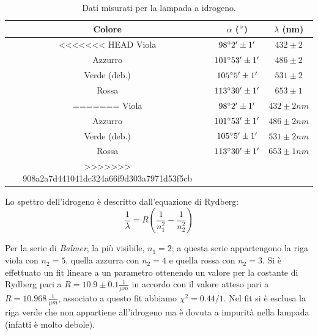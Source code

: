 \documentclass[10pt,a4paper]{article}
\begin{document}
\begin{table}[!htb]
\begin{table}[!htb]
\centering
\begin{tabular}{|c|c|c|}
\hline
Colore & $\alpha$ ($\degree$) & $\lambda$ (nm)\\
\hline 
<<<<<<< HEAD
Viola & $98 \degree 2' \pm 1'$ & $432 \pm 2$ \\ 
\hline 
Azzurro & $101 \degree 53' \pm 1'$ & $486 \pm 2 $ \\ 
\hline 
Verde (deb.)& $105 \degree 5' \pm 1'$ & $531 \pm 2 $ \\ 
\hline 
Rossa & $113 \degree 30' \pm 1'$ & $653 \pm 1 $ \\ 
=======
Viola & $98 \degree 2' \pm 1'$ & $432 \pm 2 nm$ \\ 
\hline 
Azzurro & $101 \degree 53' \pm 1'$ & $486 \pm 2 nm$ \\ 
\hline 
Verde (deb.)& $105 \degree 5' \pm 1'$ & $531 \pm 2 nm$ \\ 
\hline 
Rossa & $113 \degree 30' \pm 1'$ & $653 \pm 1 nm$ \\ 
>>>>>>> 908a2a7d441041dc324a66f9d303a7971d53f5cb
\hline 
\end{tabular} 
\caption{Dati misurati per la lampada a idrogeno.}\label{idrogeno}
\end{table}

Lo spettro dell'idrogeno è descritto dall'equazione di Rydberg:
\begin{equation}
\frac{1}{\lambda}=R \left( \frac{1}{n_{1}^2}-\frac{1}{n_{2}^2} \right)
\end{equation}

Per la serie di \emph{Balmer}, la più visibile, $n_1=2$; a questa serie appartengono la riga viola con $n_2=5$, quella azzurra con $n_2=4$ e quella rossa con $n_2=3$. Si è effettuato un fit lineare a un parametro ottenendo un valore per la costante di Rydberg pari a $R = 10.9 \pm 0.1 \frac{1}{\mu m}$ in accordo con il valore atteso pari a $R=10.968\, \frac{1}{\mu m}$, associato a questo fit abbiamo $\chi^2 = 0.44/1$. Nel fit si è esclusa la riga verde che non appartiene all'idrogeno ma è dovuta a impurità nella lampada (infatti è molto debole).\\


\end{table}
\end{document}
